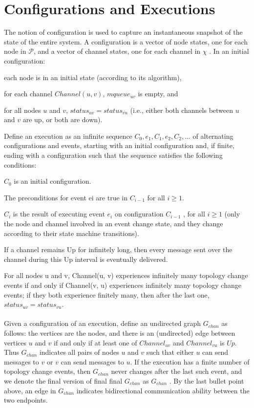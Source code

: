\section{Configurations and Executions}
The notion of configuration is used to capture an instantaneous snapshot of the state of the entire system. A configuration is a vector of node states, one for each node in $\mathcal{P}$, and a vector of channel states, one for each channel in $\chi$ . In an initial configuration:
\begin{list}{--}{spacing}
	\item each node is in an initial state (according to its algorithm),
	\item for each channel $Channel(u, v)$, $mqueue_{uv}$ is empty, and
	\item for all nodes $u$ and $v$, $status_{uv} = status_{vu}$ (i.e., either both channels between $u$ and $v$ are up, or both are down).
\end{list}
Define an execution as an infinite sequence $C_0, e_1 ,C_1, e_2 ,C_2,...$ of alternating configurations and events, starting with an initial configuration and, if finite, ending with a configuration such that the sequence satisfies the following conditions:
\begin{list}{--}{spacing}
\item  $C_0$ is an initial configuration.
\item The preconditions for event ei are true in $C_{i-1}$ for all $i\geq 1$.
\item $C_i$ is the result of executing event $e_i$ on configuration $C_{i-1}$ , for all $i\geq 1$ (only the node and channel involved in an event change state, and they change according to their state machine transitions).
\item If a channel remains Up for infinitely long, then every message sent over the channel during this Up interval is eventually delivered.
\item For all nodes u and v, Channel(u, v) experiences infinitely many topology change events if and only if Channel(v, u) experiences infinitely many topology change events; if they both experience finitely many, then after the last one, $status_{uv} = status_{vu}$.
\end{list}
\paragraph{}Given a configuration of an execution, define an undirected graph $G_{chan}$ as follows: the vertices are the nodes, and there is an (undirected) edge between vertices $u$ and $v$ if and only if at least one of $Channel_{uv}$ and $Channel_{vu}$ is $Up$. Thus $G_{chan}$ indicates all pairs of nodes $u$ and $v$ such that either $u$ can send messages to $v$ or $v$ can send messages to $u$. If the execution has a finite number of topology change events, then $G_{chan}$ never changes after the last such event, and we denote the final version of final final $G_{chan}$ as $G_{chan}$ . By the last bullet point above, an edge in $G_{chan}$ indicates bidirectional communication ability between the two endpoints.
